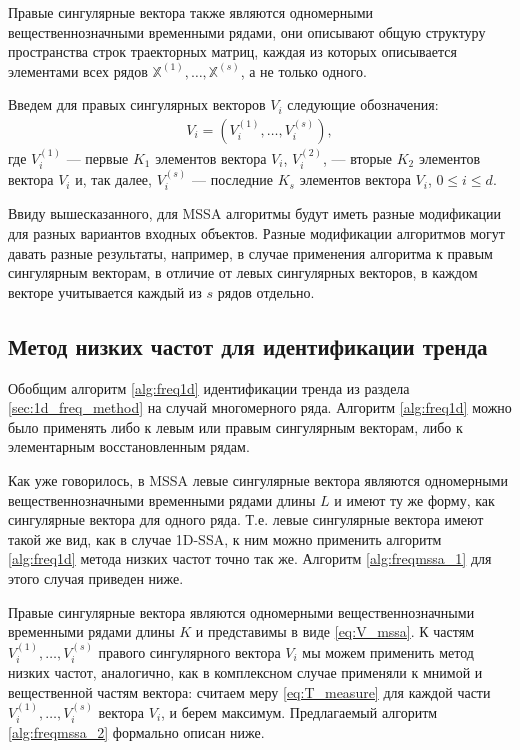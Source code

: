 \documentclass[specialist,
               substylefile = spbu.rtx,
               subf,href,colorlinks=true, 12pt]{disser}
\begin{document}
 Правые сингулярные вектора также являются одномерными вещественнозначными временными рядами,  они описывают общую структуру пространства строк траекторных матриц, каждая из которых описывается элементами всех рядов $\mathbb{X}^{(1)}, \ldots, \mathbb{X}^{(s)}$, а не только одного.
 

Введем для правых сингулярных векторов $V_i$ следующие обозначения: 
\begin{gather} \label{eq:V_mssa}
{V}_{i} = \left({V}_i^{(1)}, \ldots, {V}_i^{(s)}\right), 
\end{gather}
где $V_i^{(1)}$ --- первые $K_1$ элементов вектора ${V}_{i}$,  $V_i^{(2)}$, --- вторые $K_2$ элементов вектора ${V}_{i}$ и, так далее, $V_i^{(s)}$ --- последние $K_s$ элементов вектора ${V}_{i}$, $0 \leqslant i \leqslant d$. 

Ввиду вышесказанного, для MSSA алгоритмы будут иметь разные модификации для разных вариантов входных объектов. Разные модификации алгоритмов могут давать разные результаты, например, в случае применения алгоритма к правым сингулярным векторам, в отличие от левых сингулярных векторов, в каждом векторе учитывается каждый из $s$ рядов отдельно.  
 

\subsection{Метод низких частот для идентификации тренда}
\label{sec:freq_method_mssa}

Обобщим алгоритм \ref{alg:freq1d} идентификации тренда из раздела \ref{sec:1d_freq_method} на случай многомерного ряда. Алгоритм \ref{alg:freq1d} можно было применять либо к левым или правым сингулярным векторам, либо к элементарным восстановленным рядам. 

Как уже говорилось, в MSSA левые сингулярные вектора являются одномерными вещественнозначными временными рядами длины $L$ и имеют ту же форму, как сингулярные вектора для одного ряда. Т.е. левые сингулярные вектора имеют такой же вид, как в случае 1D-SSA, к ним можно применить алгоритм \ref{alg:freq1d} метода низких частот точно так же. Алгоритм \ref{alg:freqmssa_1} для этого случая приведен ниже.

Правые сингулярные вектора являются одномерными вещественнозначными временными рядами длины $K$ и представимы в виде \eqref{eq:V_mssa}. К частям ${V}_i^{(1)}, \ldots, {V}_i^{(s)}$ правого сингулярного вектора $V_i$ мы можем применить метод низких частот, аналогично, как в комплексном случае применяли к мнимой и вещественной частям вектора: считаем меру \eqref{eq:T_measure} для каждой части ${V}_i^{(1)}, \ldots, {V}_i^{(s)}$ вектора $V_i$, и берем максимум. Предлагаемый алгоритм \ref{alg:freqmssa_2} формально описан ниже.
\end{document}
